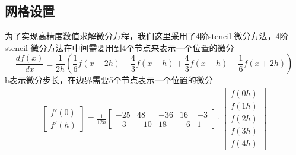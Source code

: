 \subsection{网格设置}
为了实现高精度数值求解微分方程，我们这里采用了4阶stencil 微分方法\cite{mishra2022order}，4阶stencil 微分方法在中间需要用到4个节点来表示一个位置的微分
\begin{equation}\label{eq:diffstencil}
\frac{d f(x)}{d x}\equiv	\frac{1}{2 h}\left(\frac{1}{6} f(x-2 h)-\frac{4}{3} f(x-h)+\frac{4}{3} f(x+h)-\frac{1}{6} f(x+2 h)\right)
\end{equation}
h表示微分步长，在边界需要5个节点表示一个位置的微分
\begin{align}
\begin{bmatrix}
f'(0)\\f'(h)
\end{bmatrix}
\equiv	
\frac{1}{12h}\begin{bmatrix}
  -25&  48&  -36&  16& -3\\
  -3&  -10&  18&  -6&1
\end{bmatrix}
\cdot
\begin{bmatrix}
f(0h)\\f(1h)\\f(2h)\\f(3h)\\f(4h)
\end{bmatrix}
\end{align}

